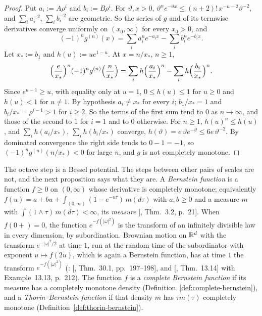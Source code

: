 \begin{proof}
\leanok
Put $a_i := A\rho^i$ and $b_i := B\rho^i$. For $\vartheta, x > 0$,
$\vartheta^ne^{-\vartheta x} \le (n + 2)!\,x^{-n-2}\vartheta^{-2}$, and $\sum_ia_i^{-2}$,
$\sum_ib_i^{-2}$ are geometric. So the series of $g$ and of its termwise derivatives converge
uniformly on $(x_0, \infty)$ for every $x_0 > 0$, and
\[
  (-1)^ng^{(n)}(x) = \sum_ia_i^ne^{-a_ix} - \sum_ib_i^ne^{-b_ix} .
\]
Let $x_* := b_1$ and $h(u) := ue^{1-u}$. At $x = n/x_*$, $n \ge 1$,
\[
  \Bigl(\frac{e}{x_*}\Bigr)^n(-1)^ng^{(n)}\Bigl(\frac{n}{x_*}\Bigr)
   = \sum_ih\Bigl(\frac{a_i}{x_*}\Bigr)^n - \sum_ih\Bigl(\frac{b_i}{x_*}\Bigr)^n .
\]
Since $e^{u-1} \ge u$, with equality only at $u = 1$, $0 \le h(u) \le 1$ for $u \ge 0$ and
$h(u) < 1$ for $u \ne 1$. By hypothesis $a_i \ne x_*$ for every $i$; $b_1/x_* = 1$ and
$b_i/x_* = \rho^{i-1} > 1$ for $i \ge 2$. So the terms of the first sum tend to $0$ as $n \to \infty$,
and those of the second to $1$ for $i = 1$ and to $0$ otherwise. For $n \ge 1$, $h(u)^n \le h(u)$,
and $\sum_ih(a_i/x_*)$, $\sum_ih(b_i/x_*)$ converge, $h(\vartheta) = e\,\vartheta e^{-\vartheta} \le
6e\,\vartheta^{-2}$. By dominated convergence the right side tends to $0 - 1 = -1$, so
$(-1)^ng^{(n)}(n/x_*) < 0$ for large $n$, and $g$ is not completely monotone.
\end{proof}

The octave step is a Bessel potential. The steps between other pairs of scales are not, and the
next proposition says what they are. A \emph{Bernstein function} is a function $f \ge 0$ on
$(0, \infty)$ whose derivative is completely monotone; equivalently
$f(u) = a + bu + \int_{(0,\infty)}(1 - e^{-u\tau})\,m(d\tau)$ with $a, b \ge 0$ and a measure $m$
with $\int(1 \wedge \tau)\,m(d\tau) < \infty$, its \emph{\Levy{} measure}
[, Thm.~3.2, p.~21]. When $f(0{+}) = 0$, the function
$e^{-f(|\omega|^2)}$ is the transform of an infinitely divisible law in every dimension, by
subordination. Brownian motion on $\mathbb{R}^d$ with the transform $e^{-|\omega|^2/2}$ at time $1$, run at
the random time of the subordinator with exponent $u \mapsto f(2u)$, which is again a Bernstein
function, has at time $1$ the transform $e^{-f(|\omega|^2)}$ (:
[, Thm.~30.1, pp.~197--198], and [, Thm.~13.14]
with Example~13.13, p.~212). The function $f$ is a \emph{complete Bernstein function} if its
\Levy{} measure has a completely monotone density (Definition~\ref{def:complete-bernstein}), and a
\emph{Thorin--Bernstein function} if that density $m$ has $\tau m(\tau)$ completely monotone
(Definition~\ref{def:thorin-bernstein}).

